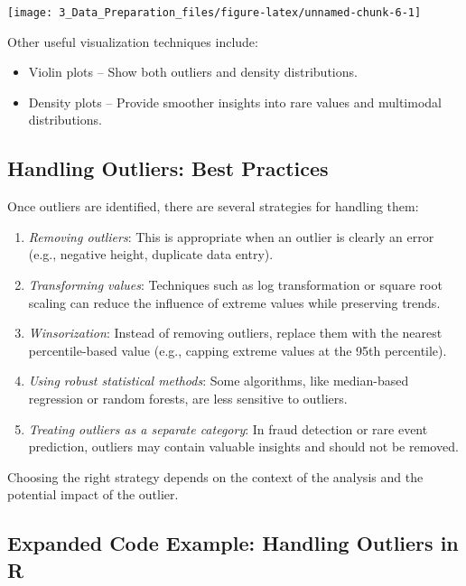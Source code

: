 \documentclass[
  11pt,
]{book}
\providecommand{\tightlist}{%
  \setlength{\itemsep}{0pt}\setlength{\parskip}{0pt}}
\theoremstyle{definition}
\theoremstyle{definition}
\theoremstyle{definition}
\theoremstyle{definition}
\theoremstyle{remark}
\begin{document}
\begin{center}\texttt{[image: 3\_Data\_Preparation\_files/figure-latex/unnamed-chunk-6-1]} \end{center}

Other useful visualization techniques include:

\begin{itemize}
\tightlist
\item
  Violin plots -- Show both outliers and density distributions.
\item
  Density plots -- Provide smoother insights into rare values and multimodal distributions.
\end{itemize}

\subsection*{Handling Outliers: Best Practices}\label{handling-outliers-best-practices}


Once outliers are identified, there are several strategies for handling them:

\begin{enumerate}
\def\labelenumi{\arabic{enumi}.}
\tightlist
\item
  \emph{Removing outliers}: This is appropriate when an outlier is clearly an error (e.g., negative height, duplicate data entry).
\item
  \emph{Transforming values}: Techniques such as log transformation or square root scaling can reduce the influence of extreme values while preserving trends.
\item
  \emph{Winsorization}: Instead of removing outliers, replace them with the nearest percentile-based value (e.g., capping extreme values at the 95th percentile).
\item
  \emph{Using robust statistical methods}: Some algorithms, like median-based regression or random forests, are less sensitive to outliers.
\item
  \emph{Treating outliers as a separate category}: In fraud detection or rare event prediction, outliers may contain valuable insights and should not be removed.
\end{enumerate}

Choosing the right strategy depends on the context of the analysis and the potential impact of the outlier.

\subsection*{Expanded Code Example: Handling Outliers in R}\label{expanded-code-example-handling-outliers-in-r}
\end{document}

